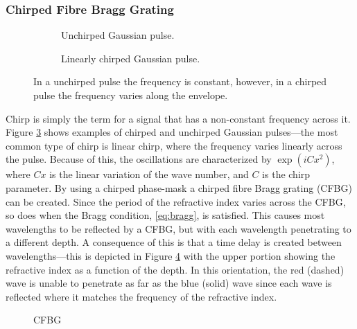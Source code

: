 \subsubsection{Chirped Fibre Bragg Grating}
\begin{figure}[tbp]
\begin{subfigure}{0.5\textwidth}

\caption{Unchirped Gaussian pulse.}
\label{fig:unchirped}
\end{subfigure}
\begin{subfigure}{0.5\textwidth}

\caption{Linearly chirped Gaussian pulse.}
\label{fig:chirped}
\end{subfigure}
\caption{In a unchirped pulse the frequency is constant, however, in a chirped pulse the frequency varies along the envelope.}
\label{fig:chirp}
\end{figure}

Chirp is simply the term for a signal that has a non-constant frequency across it. Figure \ref{fig:chirp} shows examples of chirped and unchirped Gaussian pulses---the most common type of chirp is linear chirp, where the frequency varies linearly across the pulse. Because of this, the oscillations are characterized by $\exp \left( i C x^2 \right)$, where $C x$ is the linear variation of the wave number, and $C$ is the chirp parameter. By using a chirped phase-mask a chirped fibre Bragg grating (CFBG) can be created. Since the period of the refractive index varies across the CFBG, so does when the Bragg condition, \eqref{eq:bragg}, is satisfied. This causes most wavelengths to be reflected by a CFBG, but with each wavelength penetrating to a different depth. A consequence of this is that a time delay is created between wavelengths---this is depicted in Figure \ref{fig:cfbg} with the upper portion showing  the refractive index as a function of the depth. In this orientation, the red (dashed) wave is unable to penetrate as far as the blue (solid) wave since each wave is reflected where it matches the frequency of the refractive index.  \\

\begin{figure}[tbp]
\centering

\caption[CFBG]{CFBG}
\label{fig:cfbg}
\end{figure}

